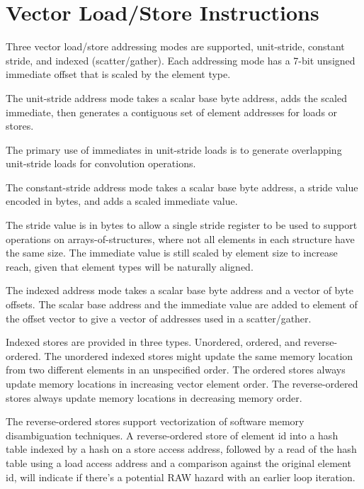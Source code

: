 \section{Vector Load/Store Instructions}

Three vector load/store addressing modes are supported, unit-stride,
constant stride, and indexed (scatter/gather).  Each addressing mode
has a 7-bit unsigned immediate offset that is scaled by the element
type.

The unit-stride address mode takes a scalar base byte address, adds
the scaled immediate, then generates a contiguous set of element
addresses for loads or stores.

\begin{commentary}
  The primary use of immediates in unit-stride loads is to generate
  overlapping unit-stride loads for convolution operations.
\end{commentary}

The constant-stride address mode takes a scalar base byte address, a
stride value encoded in bytes, and adds a scaled immediate value.

\begin{commentary}
  The stride value is in bytes to allow a single stride register to be
  used to support operations on arrays-of-structures, where not all
  elements in each structure have the same size.  The immediate value
  is still scaled by element size to increase reach, given that
  element types will be naturally aligned.
\end{commentary}

The indexed address mode takes a scalar base byte address and a vector
of byte offsets.  The scalar base address and the immediate value are
added to element of the offset vector to give a vector of addresses
used in a scatter/gather.

Indexed stores are provided in three types.  Unordered, ordered, and
reverse-ordered.  The unordered indexed stores might update the same
memory location from two different elements in an unspecified order.
The ordered stores always update memory locations in increasing vector
element order.  The reverse-ordered stores always update memory
locations in decreasing memory order.

\begin{commentary}
  The reverse-ordered stores support vectorization of software memory
  disambiguation techniques.  A reverse-ordered store of element id
  into a hash table indexed by a hash on a store access address,
  followed by a read of the hash table using a load access address and
  a comparison against the original element id, will indicate if
  there's a potential RAW hazard with an earlier loop iteration.
\end{commentary}

